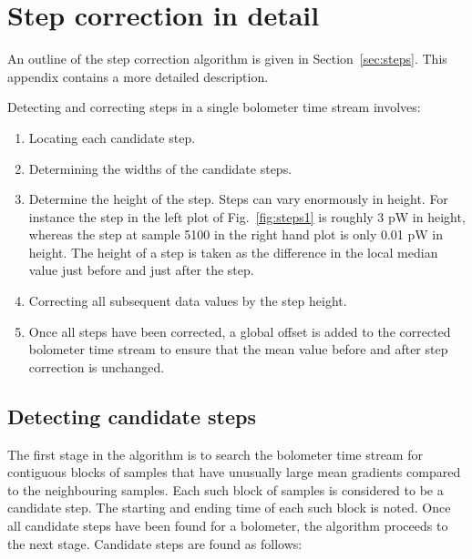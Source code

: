 \documentclass[useAMS,usenatbib,nofootinbib]{mn2e}
\begin{document}
\appendix
\section[]{Step correction in detail}

An outline of the step correction algorithm is given in
Section~\ref{sec:steps}. This appendix contains a more detailed
description.

Detecting and correcting steps in a single bolometer time stream involves:

\begin{enumerate}

\item Locating each candidate step.

\item Determining the widths of the candidate steps.

\item Determine the height of the step. Steps can vary enormously in height.
For instance the step in the left plot of Fig.~\ref{fig:steps1} is
roughly 3 pW in height, whereas the step at sample 5100 in the right hand
plot is only 0.01 pW in height. The height of a step is taken as the
difference in the local median value just before and just after the step.

\item Correcting all subsequent data values by the step height.

\item Once all steps have been corrected, a global offset is added to the
corrected bolometer time stream to ensure that the mean value before and
after step correction is unchanged.

\end{enumerate}

\subsection{Detecting candidate steps}
The first stage in the algorithm is to search the bolometer time stream for
contiguous blocks of samples that have unusually large mean gradients
compared to the neighbouring samples. Each such block of samples is
considered to be a candidate step. The starting and ending time of each
such block is noted. Once all candidate steps have been found for a
bolometer, the algorithm proceeds to the next stage. Candidate steps are
found as follows:
\end{document}
